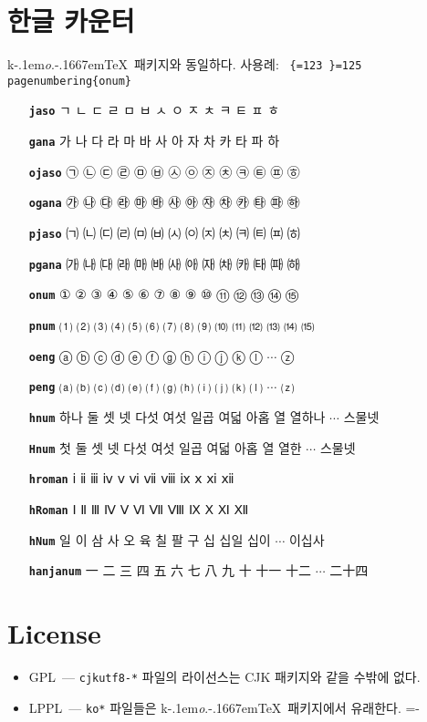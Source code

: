\documentclass[dvipdfmx,b5paper]{article}
\def\cs#1{\texttt{\color{teal}\char92 \chardef\{=123 \chardef\}=125 #1}}
\def\koTeX{\textsf{k}\kern-.1em\textit{o}.\kern-.1667em\TeX}
\begin{document}
\section{한글 카운터}
\koTeX\ 패키지와 동일하다. 사용례: \cs{pagenumbering\{onum\}}
\begin{itemize}\leftskip=1cm =1em \itemsep=0pt plus0pt
      \def\cs#1{\texttt{\bfseries #1}}
  \item[\cs{jaso}] ㄱ ㄴ ㄷ ㄹ ㅁ ㅂ ㅅ ㅇ ㅈ ㅊ ㅋ ㅌ ㅍ ㅎ
  \item[\cs{gana}] 가 나 다 라 마 바 사 아 자 차 카 타 파 하
  \item[\cs{ojaso}] ㉠ ㉡ ㉢ ㉣ ㉤ ㉥ ㉦ ㉧ ㉨ ㉩ ㉪ ㉫ ㉬ ㉭
  \item[\cs{ogana}] ㉮ ㉯ ㉰ ㉱ ㉲ ㉳ ㉴ ㉵ ㉶ ㉷ ㉸ ㉹ ㉺ ㉻
  \item[\cs{pjaso}] ㈀ ㈁ ㈂ ㈃ ㈄ ㈅ ㈆ ㈇ ㈈ ㈉ ㈊ ㈋ ㈌ ㈍
  \item[\cs{pgana}] ㈎ ㈏ ㈐ ㈑ ㈒ ㈓ ㈔ ㈕ ㈖ ㈗ ㈘ ㈙ ㈚ ㈛
  \item[\cs{onum}]  ① ② ③ ④ ⑤ ⑥ ⑦ ⑧ ⑨ ⑩ ⑪ ⑫ ⑬ ⑭ ⑮
  \item[\cs{pnum}] ⑴ ⑵ ⑶ ⑷ ⑸ ⑹ ⑺ ⑻ ⑼ ⑽ ⑾ ⑿ ⒀ ⒁ ⒂
  \item[\cs{oeng}] ⓐ ⓑ ⓒ ⓓ ⓔ ⓕ ⓖ ⓗ ⓘ ⓙ ⓚ ⓛ $\cdots$ ⓩ
  \item[\cs{peng}] ⒜ ⒝ ⒞ ⒟ ⒠ ⒡ ⒢ ⒣ ⒤ ⒥ ⒦ ⒧ $\cdots$ ⒵
  \item[\cs{hnum}] 하나 둘 셋 넷 다섯 여섯 일곱 여덟 아홉 열 열하나 $\cdots$ 스물넷
  \item[\cs{Hnum}] 첫 둘 셋 넷 다섯 여섯 일곱 여덟 아홉 열 열한 $\cdots$ 스물넷
  \item[\cs{hroman}] ⅰ ⅱ ⅲ ⅳ ⅴ ⅵ ⅶ ⅷ ⅸ ⅹ ⅺ ⅻ
  \item[\cs{hRoman}] Ⅰ Ⅱ Ⅲ Ⅳ Ⅴ Ⅵ Ⅶ Ⅷ Ⅸ Ⅹ Ⅺ Ⅻ
  \item[\cs{hNum}] 일 이 삼 사 오 육 칠 팔 구 십 십일 십이 $\cdots$ 이십사
  \item[\cs{hanjanum}] 一 二 三 四 五 六 七 八 九 十 十一 十二 $\cdots$ 二十四
\end{itemize}

\section{License}
\begin{itemize}
  \item GPL~--- \verb|cjkutf8-*| 파일의 라이선스는 CJK 패키지와
    같을 수밖에 없다.
  \item LPPL~--- \verb|ko*| 파일들은 \koTeX\ 패키지에서 유래한다.
  \hfill \fboxsep=-\fboxrule
\end{itemize}
\end{document}
